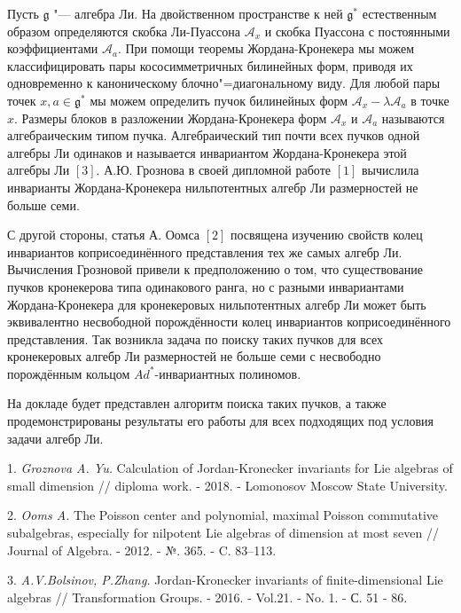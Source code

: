 

\vzmscaption



Пусть $\mathfrak{g}$ "--- алгебра Ли. На двойственном пространстве к ней $\mathfrak{g}^{\ast}$ естественным образом определяются скобка Ли-Пуассона $\mathcal{A}_{x}$ и скобка Пуассона с постоянными коэффициентами $\mathcal{A}_{a}$. При помощи теоремы Жордана-Кронекера мы можем классифицировать пары кососимметричных билинейных форм, приводя их одновременно к каноническому блочно"=диагональному виду. Для любой пары точек $x,a \in\mathfrak{g}^{\ast}$ мы можем определить пучок билинейных форм $\mathcal{A}_{x} - \lambda \mathcal{A}_{a}$ в точке $x$. Размеры блоков в разложении Жордана-Кро\-не\-ке\-ра форм $\mathcal{A}_{x}$ и $\mathcal{A}_{a}$ называются алгебраическим типом пучка. Алгебраический тип почти всех пучков одной алгебры Ли одинаков и называется инвариантом Жордана-Кронекера этой алгебры Ли $\left[ 3 \right]$. А.Ю. Грознова в своей дипломной работе $\left[ 1 \right]$ вычислила инварианты Жордана-Кронекера нильпотентных алгебр Ли размерностей не больше семи.

С другой стороны, статья А. Оомса $\left[ 2 \right] $ посвящена изучению свойств колец инвариантов коприсоединённого представления тех же самых алгебр Ли. Вычисления Грозновой привели к предположению о том, что существование пучков кронекерова типа одинакового ранга, но с разными инвариантами Жордана-Кронекера для кронекеровых нильпотентных алгебр Ли может быть эквивалентно несвободной порождённости колец инвариантов коприсоединённого представления. Так возникла задача по поиску таких пучков для всех кронекеровых алгебр Ли размерностей не больше семи с несвободно порождённым кольцом $Ad^{\ast}$-инвариантных полиномов.

На докладе будет представлен алгоритм поиска таких пучков, а также продемонстрированы результаты его работы для всех подходящих под условия задачи алгебр Ли.

\litlist

1. {\it Groznova A. Yu.}
Calculation of Jordan-Kronecker in\-va\-riants for Lie algebras of small dimension // diploma work. - 2018. - Lomonosov Moscow State University.

2. {\it Ooms A.}
The Poisson center and polynomial, maximal Poisson commutative subalgebras, especially for nilpotent Lie algebras of dimension at most seven // Journal of Algebra. - 2012. - №. 365. - C. 83--113.

3. {\it A.V.Bolsinov, P.Zhang.}
Jordan-Kronecker invariants of finite-dimensional Lie algebras // Transformation Groups. - 2016. -   Vol.21. - No. 1. -  С. 51 - 86.

